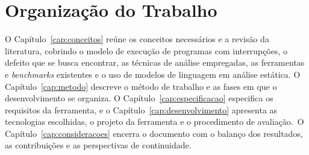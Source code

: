\section{Organização do Trabalho}
\label{sec:organizacao}

O Capítulo~\ref{cap:conceitos} reúne os conceitos necessários e a revisão da
literatura, cobrindo o modelo de execução de programas com interrupções, o
defeito que se busca encontrar, as técnicas de análise empregadas, as
ferramentas e \textit{benchmarks} existentes e o uso de modelos de linguagem em
análise estática. O Capítulo~\ref{cap:metodo} descreve o método de trabalho e
as fases em que o desenvolvimento se organiza. O
Capítulo~\ref{cap:especificacao} especifica os requisitos da ferramenta, e o
Capítulo~\ref{cap:desenvolvimento} apresenta as tecnologias escolhidas, o
projeto da ferramenta e o procedimento de avaliação.\ifparcial\else\ O
Capítulo~\ref{cap:consideracoes} encerra o documento com o balanço dos
resultados, as contribuições e as perspectivas de continuidade.\fi
